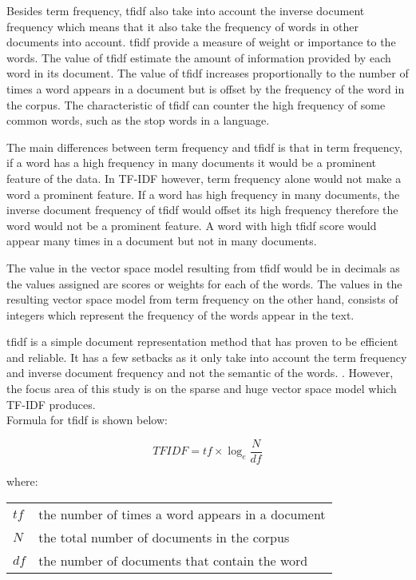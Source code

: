 Besides term frequency, \ac{tfidf} also take into account the inverse document frequency which means that it also take the frequency of words in other documents into account. \ac{tfidf} provide a measure of weight or importance to the words. The value of \ac{tfidf} estimate the amount of information provided by each word in its document. The value of \ac{tfidf} increases proportionally to the number of times a word appears in a document but is offset by the frequency of the word in the corpus. \cite{textMiningTfidf} The characteristic of \ac{tfidf} can counter the high frequency of some common words, such as the stop words in a language. 

The main differences between term frequency and \ac{tfidf} is that in term frequency, if a word has a high frequency in many documents it would be a prominent feature of the data. In TF-IDF however, term frequency alone would not make a word a prominent feature. If a word has high frequency in many documents, the inverse document frequency of \ac{tfidf} would offset its high frequency therefore the word would not be a prominent feature. A word with high \ac{tfidf} score would appear many times in a document but not in many documents. 

The value in the vector space model resulting from \ac{tfidf} would be in decimals as the values assigned are scores or weights for each of the words. The values in the resulting vector space model from term frequency on the other hand, consists of integers which represent the frequency of the words appear in the text.

\Ac{tfidf} is a simple document representation method that has proven to be efficient and reliable. It has a few setbacks as it only take into account the term frequency and inverse document frequency and not the semantic of the words. \cite{tfidfDrawback}. However, the focus area of this study is on the sparse and huge vector space model which TF-IDF produces.\\

Formula for \ac{tfidf} is shown below:

\begin{equation}
TFIDF = tf \times \log_e \frac{N}{df}
\end{equation}
	
where:
	
\begin{center}
\begin{tabular}{l @{ $=$ } l}
	$tf$ & the number of times a word appears in a document \\
	$N$ & the total number of documents in the corpus \\
	$df$ & the number of documents that contain the word
\end{tabular}
\end{center}

